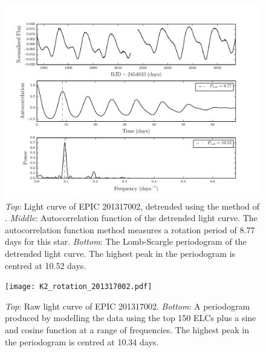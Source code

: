 \documentclass[useAMS, usenatbib]{aastex}
\begin{document}
\begin{figure}
\begin{center}
\includegraphics[width=6in, clip=true]{rotation_poster_child.pdf}
\caption{{\it Top}: Light curve of EPIC 201317002, detrended using the method
of \citet{Vanderburg2014}. {\it Middle}: Autocorrelation function of the
detrended light curve. The autocorrelation function method measures a rotation
period of 8.77 days for this star. {\it Bottom}: The Lomb-Scargle periodogram
of the detrended light curve. The highest peak in the periodogram is centred at
10.52 days.}
\label{fig:rotation_poster_child}
\end{center}
\end{figure}

\begin{figure}
\begin{center}
\texttt{[image: K2\_rotation\_201317002.pdf]}
\caption{{\it Top}: Raw light curve of EPIC 201317002. {\it Bottom}: A
periodogram produced by modelling the data using the top 150 ELCs
plus a sine and cosine function at a range of frequencies. The highest peak in
the periodogram is centred at 10.34 days.}
\label{fig:K2_rotation_poster_child}
\end{center}
\end{figure}
\end{document}

